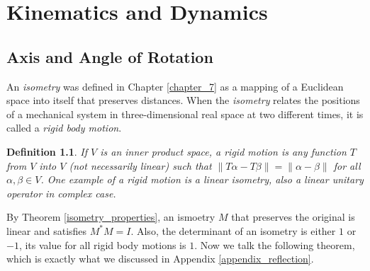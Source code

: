 \documentclass[11pt]{book}
\newtheorem{definition}{Definition}[section]
\theoremstyle{definition}
\numberwithin{equation}{chapter}
\begin{document}
\chapter{Kinematics and Dynamics}
\section{Axis and Angle of Rotation}

An {\em isometry} was defined in Chapter \ref{chapter_7} as a mapping of a Euclidean space into itself that preserves distances. When the {\em isometry} relates the positions of a mechanical system in three-dimensional real space at two different times, it is called a {\em rigid body motion}.

\medskip

\begin{definition}{\rm \cite{33}}
If $V$ is an inner product space, a rigid motion is any function $T$ from $V$ into $V$ (not necessarily linear) such that $\|T\alpha - T\beta\| = \|\alpha - \beta\|$ for all $\alpha, \beta \in V$. One example of a rigid motion is a linear isometry, also a linear unitary operator in complex case. 
\end{definition}

\medskip

By Theorem \ref{isometry_properties}, an ismoetry $M$ that preserves the original is linear and satisfies $M^*M = I$. Also, the determinant of an isometry is either $1$ or $-1$, its value for all rigid body motions is $1$. Now we talk the following theorem, which is exactly what we discussed in Appendix \ref{appendix_reflection}.

\medskip
\end{document}
